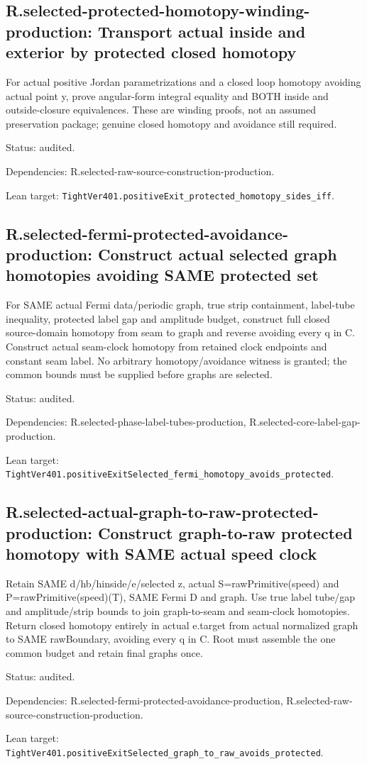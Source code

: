 \documentclass{article}
\begin{document}
\subsection*{R.selected-protected-homotopy-winding-production: Transport actual inside and exterior by protected closed homotopy}
For actual positive Jordan parametrizations and a closed loop homotopy avoiding actual point y, prove angular-form integral equality and BOTH inside and outside-closure equivalences. These are winding proofs, not an assumed preservation package; genuine closed homotopy and avoidance still required.
\par Status: audited.
\par Dependencies: R.selected-raw-source-construction-production.
\par Lean target: \texttt{TightVer401.positiveExit\_protected\_homotopy\_sides\_iff}.
\subsection*{R.selected-fermi-protected-avoidance-production: Construct actual selected graph homotopies avoiding SAME protected set}
For SAME actual Fermi data/periodic graph, true strip containment, label-tube inequality, protected label gap and amplitude budget, construct full closed source-domain homotopy from seam to graph and reverse avoiding every q in C. Construct actual seam-clock homotopy from retained clock endpoints and constant seam label. No arbitrary homotopy/avoidance witness is granted; the common bounds must be supplied before graphs are selected.
\par Status: audited.
\par Dependencies: R.selected-phase-label-tubes-production, R.selected-core-label-gap-production.
\par Lean target: \texttt{TightVer401.positiveExitSelected\_fermi\_homotopy\_avoids\_protected}.
\subsection*{R.selected-actual-graph-to-raw-protected-production: Construct graph-to-raw protected homotopy with SAME actual speed clock}
Retain SAME d/hb/hinside/e/selected z, actual S=rawPrimitive(speed) and P=rawPrimitive(speed)(T), SAME Fermi D and graph. Use true label tube/gap and amplitude/strip bounds to join graph-to-seam and seam-clock homotopies. Return closed homotopy entirely in actual e.target from actual normalized graph to SAME rawBoundary, avoiding every q in C. Root must assemble the one common budget and retain final graphs once.
\par Status: audited.
\par Dependencies: R.selected-fermi-protected-avoidance-production, R.selected-raw-source-construction-production.
\par Lean target: \texttt{TightVer401.positiveExitSelected\_graph\_to\_raw\_avoids\_protected}.
\end{document}
